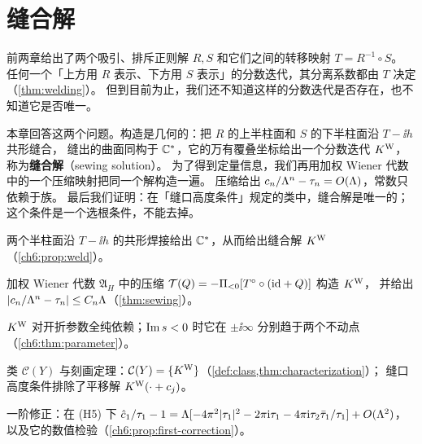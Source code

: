 \providecommand{\WienerA}{\mathfrak A}          %
\providecommand{\Tcirc}{T^{\circ}}               %
\providecommand{\Pineg}{\Pi_{<0}}                %
\providecommand{\Pinonneg}{\Pi_{\ge 0}}          %
\providecommand{\Csew}{\mathcal C}               %
\providecommand{\etwopi}[1]{\ee^{2\pi\ii #1}}    %
\providecommand{\Rtime}{\mathcal R}              %
\providecommand{\Stime}{\mathcal S}              %
\providecommand{\Band}{\mathcal B}               %

\chapter{缝合解}\label{ch:sewing}

前两章给出了两个吸引、排斥正则解 $R,S$ 和它们之间的转移映射 $T=R^{-1}\circ S$。
任何一个「上方用 $R$ 表示、下方用 $S$ 表示」的分数迭代，其分离系数都由 $T$ 决定（\cref{thm:welding}）。
但到目前为止，我们还不知道这样的分数迭代是否存在，也不知道它是否唯一。

本章回答这两个问题。构造是几何的：把 $R$ 的上半柱面和 $S$ 的下半柱面沿 $T-\ii h$ 共形缝合，
缝出的曲面同构于 $\mathbb{C}^*$，它的万有覆叠坐标给出一个分数迭代 $K^{\mathrm W}$，称为\textbf{缝合解}（sewing solution）。
为了得到定量信息，我们再用加权 Wiener 代数中的一个压缩映射把同一个解构造一遍。
压缩给出 $c_n/\Lambda^n-\tau_n=O(\Lambda)$，常数只依赖于族。
最后我们证明：在「缝口高度条件」规定的类中，缝合解是唯一的；这个条件是一个选根条件，不能去掉。

\begin{goals}
\item 两个半柱面沿 $T-\ii h$ 的共形焊接给出 $\mathbb{C}^*$，从而给出缝合解 $K^{\mathrm W}$（\cref{ch6:prop:weld}）。
\item 加权 Wiener 代数 $\WienerA_H$ 中的压缩 $\mathcal T(Q)=-\Pineg[\Tcirc\circ(\id+Q)]$ 构造 $K^{\mathrm W}$，
  并给出 $|c_n/\Lambda^n-\tau_n|\le C_n\Lambda$（\cref{thm:sewing}）。
\item $K^{\mathrm W}$ 对开折参数全纯依赖；$\operatorname{Im} s<0$ 时它在 $\pm\ii\infty$ 分别趋于两个不动点（\cref{ch6:thm:parameter}）。
\item 类 $\Csew(Y)$ 与刻画定理：$\Csew(Y)=\{\Ksew\}$（\cref{def:class,thm:characterization}）；
  缝口高度条件排除了平移解 $K^{\mathrm W}(\cdot+c_j)$。
\item 一阶修正：在 (H5) 下 $\hat c_1/\tau_1-1=\Lambda[-4\pi^2|\tau_1|^2-2\pi\mathrm{i}\tau_1-4\pi\mathrm{i}\tau_2\bar\tau_1/\tau_1]+O(\Lambda^2)$，
  以及它的数值检验（\cref{ch6:prop:first-correction}）。
\end{goals}

